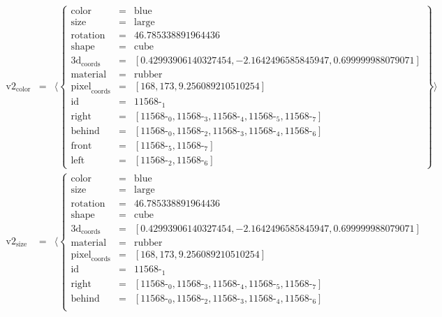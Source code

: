 \documentclass{minimal}
\begin{document}
$$\begin{array}{rcl}
\text{v2}_{\text{color}} &=& \langle \left\{\begin{array}{rcl}
\text{color} &=& \text{blue}\\
\text{size} &=& \text{large}\\
\text{rotation} &=& 46.785338891964436\\
\text{shape} &=& \text{cube}\\
\text{3d}_{\text{coords}} &=& [ 0.42993906140327454, -2.1642496585845947, 0.699999988079071]\\
\text{material} &=& \text{rubber}\\
\text{pixel}_{\text{coords}} &=& [ 168, 173, 9.256089210510254]\\
\text{id} &=& \text{11568-}_{\text{1}}\\
\text{right} &=& [ \text{11568-}_{\text{0}}, \text{11568-}_{\text{3}}, \text{11568-}_{\text{4}}, \text{11568-}_{\text{5}}, \text{11568-}_{\text{7}}]\\
\text{behind} &=& [ \text{11568-}_{\text{0}}, \text{11568-}_{\text{2}}, \text{11568-}_{\text{3}}, \text{11568-}_{\text{4}}, \text{11568-}_{\text{6}}]\\
\text{front} &=& [ \text{11568-}_{\text{5}}, \text{11568-}_{\text{7}}]\\
\text{left} &=& [ \text{11568-}_{\text{2}}, \text{11568-}_{\text{6}}]
\end{array}\right\}\rangle\\
\text{v2}_{\text{size}} &=& \langle \left\{\begin{array}{rcl}
\text{color} &=& \text{blue}\\
\text{size} &=& \text{large}\\
\text{rotation} &=& 46.785338891964436\\
\text{shape} &=& \text{cube}\\
\text{3d}_{\text{coords}} &=& [ 0.42993906140327454, -2.1642496585845947, 0.699999988079071]\\
\text{material} &=& \text{rubber}\\
\text{pixel}_{\text{coords}} &=& [ 168, 173, 9.256089210510254]\\
\text{id} &=& \text{11568-}_{\text{1}}\\
\text{right} &=& [ \text{11568-}_{\text{0}}, \text{11568-}_{\text{3}}, \text{11568-}_{\text{4}}, \text{11568-}_{\text{5}}, \text{11568-}_{\text{7}}]\\
\text{behind} &=& [ \text{11568-}_{\text{0}}, \text{11568-}_{\text{2}}, \text{11568-}_{\text{3}}, \text{11568-}_{\text{4}}, \text{11568-}_{\text{6}}]\\

\end{array}
\end{array}$$
\end{document}
